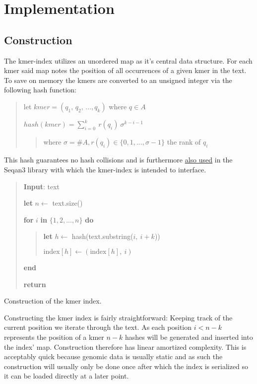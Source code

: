 \chapter{Implementation}

\section{Construction}
The kmer-index utilizes an unordered map as it's central data structure.
For each kmer said map notes the position of all occurrences of a given kmer in the text.
To save on memory the kmers are converted to an unsigned integer via
the following hash function:
\begin{verse}
let $kmer =(q_{1},\,q_{2},\,...,q_{k})$ where $q\in A$

$hash(kmer) = \sum_{i=0}^{k}\:r(q_{i})\:\sigma^{k-i-1}$
\begin{verse}
where $\sigma=\#A,r(q_{i})\in\{0,1,...,\sigma-1\}$ the rank of $q_{i}$
\end{verse}
\end{verse}
This hash guarantees no hash collisions and is furthermore
\href{http://docs.seqan.de/seqan/3-master-user/group__views.html\#ga6e598d6a021868f704d39df73252974f}{also used} in the Seqan3
library with which the kmer-index is intended to interface.

\begin{algorithm}[H]
\begin{verse}
\textbf{Input}: text

\textbf{let} $n\leftarrow$ text.size()

\textbf{for} $i$ \textbf{in} $\{1,2,...,n\}$ \textbf{do}
\begin{verse}
\textbf{let} $h\leftarrow$ hash(text.substring($i,\:i+k$))

$\text{index}[h]\leftarrow(\text{index}[h],\:i)$
\end{verse}

\textbf{end}

\textbf{return}
\end{verse}
\caption{Construction of the kmer index.}
\end{algorithm}

Constructing the kmer index is fairly straightforward: Keeping track of the current position we iterate through the
text. As each position $i<n-k$ represents the position of a kmer $n-k$ hashes will be generated and inserted into the
index' map. Construction therefore has linear amortized complexity. This is acceptably quick because genomic data is
usually static and as such the construction will usually only be done once after which the index is serialized so it
can be loaded directly at a later point.

